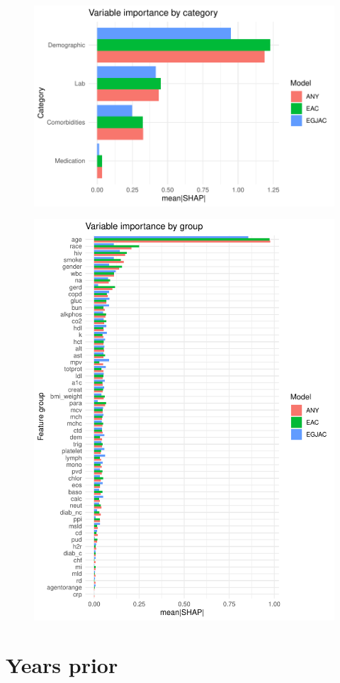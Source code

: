 \documentclass[english]{article}
\begin{document}
\begin{figure}[ht]
\includegraphics[width=0.8\linewidth]{variable_importance/shap_cat.pdf}
\end{figure}


\begin{figure}[ht]
\includegraphics[width=0.8\linewidth]{variable_importance/shap_group.pdf}
\end{figure}





\newpage
\clearpage
\section{Years prior}
\end{document}
